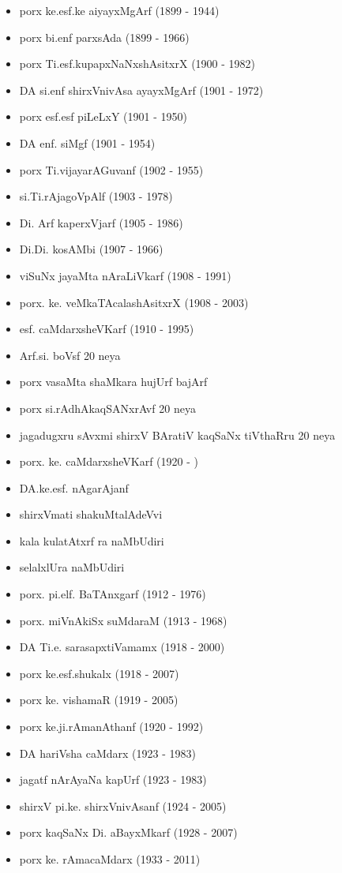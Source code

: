 {\begin{itemize}
\item porx ke.esf.ke aiyayxMgArf {\rm (1899 - 1944)}
\item porx bi.enf parxsAda {\rm (1899 - 1966)}
\item porx Ti.esf.kupapxNaNxshAsitxrX {\rm (1900 - 1982)}
\item DA si.enf shirxVnivAsa ayayxMgArf {\rm (1901 - 1972)}
\item porx esf.esf piLeLxY {\rm (1901 - 1950)}
\item DA enf. siMgf {\rm (1901 - 1954)}
\item porx Ti.vijayarAGuvanf {\rm (1902 - 1955)}
\item si.Ti.rAjagoVpAlf {\rm (1903 - 1978)}
\item Di. Arf kaperxVjarf {\rm (1905 - 1986)}
\item Di.Di. kosAMbi {\rm (1907 - 1966)}
\item viSuNx jayaMta nAraLiVkarf {\rm (1908 - 1991)}
\item porx. ke. veMkaTAcalashAsitxrX {\rm (1908 - 2003)}
\item esf. caMdarxsheVKarf {\rm (1910 - 1995)}
\item Arf.si. boVsf {\rm 20} neya 
\item porx vasaMta shaMkara hujUrf bajArf
\item porx si.rAdhAkaqSANxrAvf {\rm 20} neya
\item jagadugxru sAvxmi shirxV BAratiV kaqSaNx tiVthaRru {\rm 20} neya
\item porx. ke. caMdarxsheVKarf {\rm (1920 - )}
\item DA.ke.esf. nAgarAjanf
\item shirxVmati shakuMtalAdeVvi
\item kala kulatAtxrf ra naMbUdiri
\item selalxlUra naMbUdiri
\item porx. pi.elf. BaTAnxgarf {\rm (1912 - 1976)}
\item porx. miVnAkiSx suMdaraM {\rm (1913 - 1968)}
\item DA Ti.e. sarasapxtiVamamx {\rm (1918 - 2000)}
\item porx ke.esf.shukalx {\rm (1918 - 2007)}
\item porx ke. vishamaR {\rm (1919 - 2005)}
\item porx ke.ji.rAmanAthanf {\rm (1920 - 1992)}
\item DA hariVsha caMdarx {\rm (1923 - 1983)}
\item jagatf nArAyaNa kapUrf {\rm (1923 - 1983)}
\item shirxV pi.ke. shirxVnivAsanf {\rm (1924 - 2005)}
\item porx kaqSaNx Di. aBayxMkarf {\rm (1928 - 2007)}
\item porx ke. rAmacaMdarx {\rm (1933 - 2011)}
\end{itemize}}


